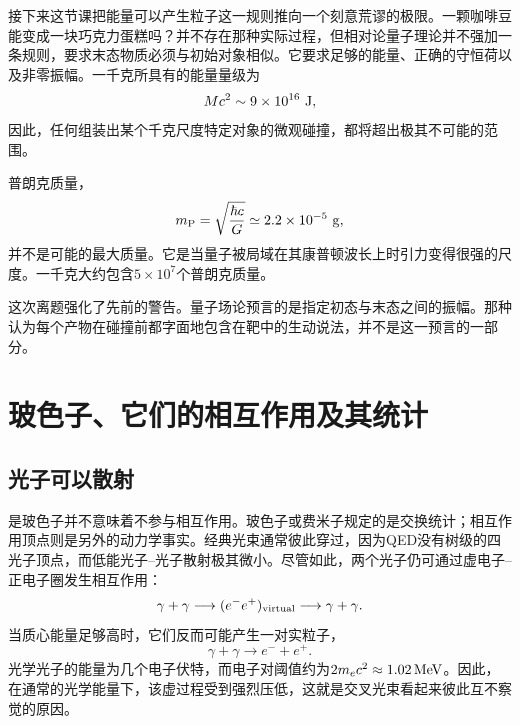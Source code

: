 接下来这节课把能量可以产生粒子这一规则推向一个刻意荒谬的极限。一颗咖啡豆能变成一块巧克力蛋糕吗？并不存在那种实际过程，但相对论量子理论并不强加一条规则，要求末态物质必须与初始对象相似。它要求足够的能量、正确的守恒荷以及非零振幅。一千克所具有的能量量级为
\begin{equation}
  Mc^2\sim9\times10^{16}\ {\rm J},
\end{equation}
因此，任何组装出某个千克尺度特定对象的微观碰撞，都将超出极其不可能的范围。

普朗克质量，
\begin{equation}
  m_{\rm P}=\sqrt{\frac{\hbar c}{G}}
  \simeq2.2\times10^{-5}\ {\rm g},
\end{equation}
并不是可能的最大质量。它是当量子被局域在其康普顿波长上时引力变得很强的尺度。一千克大约包含\(5\times10^7\)个普朗克质量。

\begin{classroomqa}
\end{classroomqa}

这次离题强化了先前的警告。量子场论预言的是指定初态与末态之间的振幅。那种认为每个产物在碰撞前都字面地包含在靶中的生动说法，并不是这一预言的一部分。

\section{玻色子、它们的相互作用及其统计}

\subsection{光子可以散射}

是玻色子并不意味着不参与相互作用。玻色子或费米子规定的是交换统计；相互作用顶点则是另外的动力学事实。经典光束通常彼此穿过，因为QED没有树级的四光子顶点，而低能光子--光子散射极其微小。尽管如此，两个光子仍可通过虚电子--正电子圈发生相互作用：
\begin{equation}
  \gamma+\gamma
  \longrightarrow(e^-e^+)_{\rm virtual}
  \longrightarrow\gamma+\gamma.
\end{equation}
当质心能量足够高时，它们反而可能产生一对实粒子，
\begin{equation}
  \gamma+\gamma\longrightarrow e^-+e^+.
\end{equation}
光学光子的能量为几个电子伏特，而电子对阈值约为\(2m_e c^2\approx1.02\,{\rm MeV}\)。因此，在通常的光学能量下，该虚过程受到强烈压低，这就是交叉光束看起来彼此互不察觉的原因。


